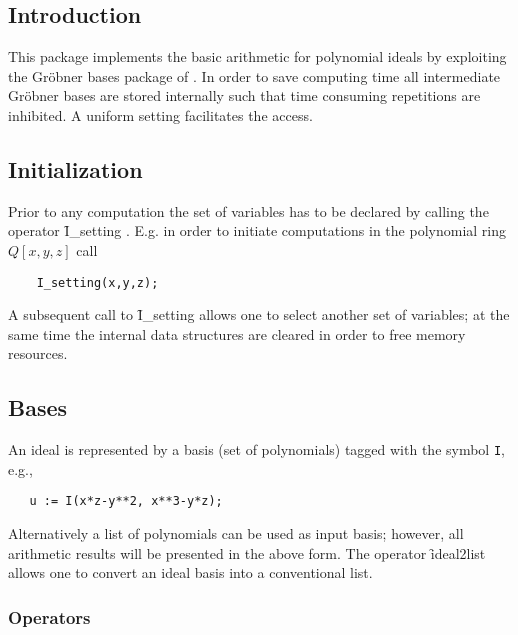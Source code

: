 

\subsection{Introduction}

This package implements the basic arithmetic for polynomial ideals
by exploiting the Gr\"obner bases package of \REDUCE.
In order to save computing time all intermediate Gr\"obner bases
are stored internally such that time consuming repetitions
are inhibited. A uniform setting facilitates the access.

\subsection{Initialization}

\hypertarget{operator:I_SETTING}{}
Prior to any computation the set of variables has to be declared
by calling the operator \f{I\_setting} . E.g. in order to initiate
computations in the polynomial ring $Q[x,y,z]$ call
\begin{verbatim}
    I_setting(x,y,z);
\end{verbatim}
A subsequent call to \f{I\_setting} allows one to select another set
of variables; at the same time the internal data structures
are cleared in order to free memory resources.

\subsection{Bases}

\hypertarget{reserved:IDEALS_I}{}
\hypertarget{operator:IDEAL2LIST}{}
An ideal is represented by a basis (set of polynomials) tagged
with the symbol \texttt{I}, e.g.,
\begin{verbatim}
   u := I(x*z-y**2, x**3-y*z);
\end{verbatim}
Alternatively a list of polynomials can be used as input basis; however,
all arithmetic results will be presented in the above form. The
operator \f{ideal2list} allows one to convert an ideal basis into a
conventional \REDUCE list.

\subsubsection{Operators}

